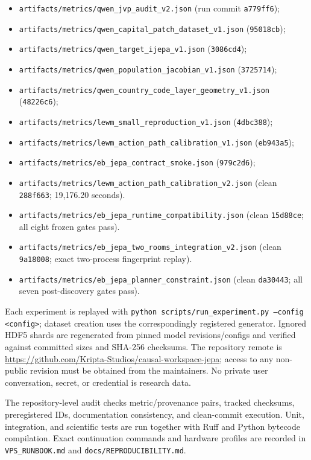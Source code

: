 \documentclass[10pt]{article}
\newcommand{\code}[1]{\texttt{#1}}
\begin{document}
\begin{itemize}[leftmargin=*]
  \item \code{artifacts/metrics/qwen\_jvp\_audit\_v2.json} (run commit
  \code{a779ff6});
  \item \code{artifacts/metrics/qwen\_capital\_patch\_dataset\_v1.json}
  (\code{95018cb});
  \item \code{artifacts/metrics/qwen\_target\_ijepa\_v1.json}
  (\code{3086cd4});
  \item \code{artifacts/metrics/qwen\_population\_jacobian\_v1.json}
  (\code{3725714});
  \item \code{artifacts/metrics/qwen\_country\_code\_layer\_geometry\_v1.json}
  (\code{48226c6});
  \item \code{artifacts/metrics/lewm\_small\_reproduction\_v1.json}
  (\code{4dbc388});
  \item \code{artifacts/metrics/lewm\_action\_path\_calibration\_v1.json}
  (\code{eb943a5});
  \item \code{artifacts/metrics/eb\_jepa\_contract\_smoke.json}
  (\code{979c2d6});
  \item \code{artifacts/metrics/lewm\_action\_path\_calibration\_v2.json}
  (clean \code{288f663}; 19,176.20 seconds).
  \item \code{artifacts/metrics/eb\_jepa\_runtime\_compatibility.json}
  (clean \code{15d88ce}; all eight frozen gates pass).
  \item \code{artifacts/metrics/eb\_jepa\_two\_rooms\_integration\_v2.json}
  (clean \code{9a18008}; exact two-process fingerprint replay).
  \item \code{artifacts/metrics/eb\_jepa\_planner\_constraint.json}
  (clean \code{da30443}; all seven post-discovery gates pass).
\end{itemize}

Each experiment is replayed with
\code{python scripts/run\_experiment.py --config <config>}; dataset creation
uses the correspondingly registered generator.  Ignored HDF5 shards are
regenerated from pinned model revisions/configs and verified against committed
sizes and SHA-256 checksums.  The repository remote is
\url{https://github.com/Kripta-Studios/causal-workspace-jepa}; access to any
non-public revision must be obtained from the maintainers.  No private user
conversation, secret, or credential is research data.

The repository-level audit checks metric/provenance pairs, tracked checksums,
preregistered IDs, documentation consistency, and clean-commit execution.
Unit, integration, and scientific tests are run together with Ruff and Python
bytecode compilation.  Exact continuation commands and hardware profiles are
recorded in \code{VPS\_RUNBOOK.md} and \code{docs/REPRODUCIBILITY.md}.
\end{document}
